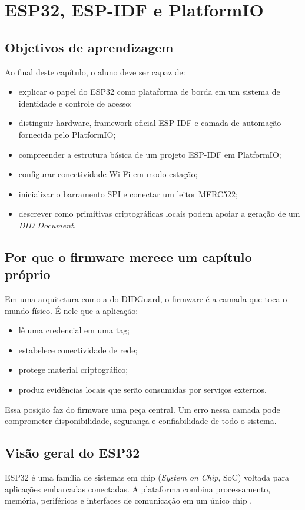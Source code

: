\chapter{ESP32, ESP-IDF e PlatformIO}
\label{chap:firmware-esp32}

\section{Objetivos de aprendizagem}
Ao final deste capítulo, o aluno deve ser capaz de:
\begin{itemize}[leftmargin=*]
  \item explicar o papel do ESP32 como plataforma de borda em um sistema de identidade e controle de acesso;
  \item distinguir hardware, framework oficial ESP-IDF e camada de automação fornecida pelo PlatformIO;
  \item compreender a estrutura básica de um projeto ESP-IDF em PlatformIO;
  \item configurar conectividade Wi-Fi em modo estação;
  \item inicializar o barramento SPI e conectar um leitor MFRC522;
  \item descrever como primitivas criptográficas locais podem apoiar a geração de um \textit{DID Document}.
\end{itemize}

\section{Por que o firmware merece um capítulo próprio}
Em uma arquitetura como a do DIDGuard, o firmware é a camada que toca o mundo físico. É nele que a aplicação:
\begin{itemize}[leftmargin=*]
  \item lê uma credencial em uma tag;
  \item estabelece conectividade de rede;
  \item protege material criptográfico;
  \item produz evidências locais que serão consumidas por serviços externos.
\end{itemize}

Essa posição faz do firmware uma peça central. Um erro nessa camada pode comprometer disponibilidade, segurança e confiabilidade de todo o sistema.

\section{Visão geral do ESP32}
ESP32 é uma família de sistemas em chip (\textit{System on Chip}, SoC) voltada para aplicações embarcadas conectadas. A plataforma combina processamento, memória, periféricos e interfaces de comunicação em um único chip \citep{espressif_esp32_overview}.

